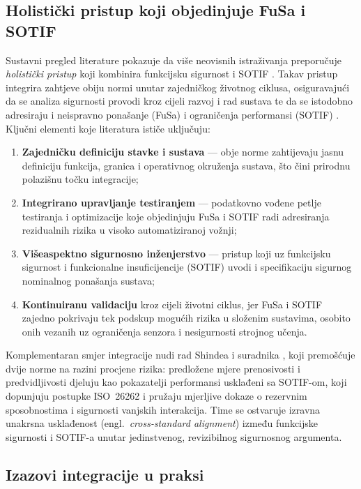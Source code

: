 \subsection{Holistički pristup koji objedinjuje FuSa i SOTIF}

Sustavni pregled literature pokazuje da više neovisnih istraživanja preporučuje \textit{holistički pristup} koji kombinira funkcijsku sigurnost i SOTIF \cite{patel2025sotifslr}. Takav pristup integrira zahtjeve obiju normi unutar zajedničkog životnog ciklusa, osiguravajući da se analiza sigurnosti provodi kroz cijeli razvoj i rad sustava te da se istodobno adresiraju i neispravno ponašanje (FuSa) i ograničenja performansi (SOTIF) \cite{patel2025sotifslr}. Ključni elementi koje literatura ističe uključuju:

\begin{enumerate}
  \item \textbf{Zajedničku definiciju stavke i sustava} — obje norme zahtijevaju jasnu definiciju funkcija, granica i operativnog okruženja sustava, što čini prirodnu polazišnu točku integracije;
  \item \textbf{Integrirano upravljanje testiranjem} — podatkovno vođene petlje testiranja i optimizacije koje objedinjuju FuSa i SOTIF radi adresiranja rezidualnih rizika u visoko automatiziranoj vožnji;
  \item \textbf{Višeaspektno sigurnosno inženjerstvo} — pristup koji uz funkcijsku sigurnost i funkcionalne insuficijencije (SOTIF) uvodi i specifikaciju sigurnog nominalnog ponašanja sustava;
  \item \textbf{Kontinuiranu validaciju} kroz cijeli životni ciklus, jer FuSa i SOTIF zajedno pokrivaju tek podskup mogućih rizika u složenim sustavima, osobito onih vezanih uz ograničenja senzora i nesigurnosti strojnog učenja.
\end{enumerate}

Komplementaran smjer integracije nudi rad Shindea i suradnika \cite{shinde2026reimagining}, koji premošćuje dvije norme na razini procjene rizika: predložene mjere prenosivosti i predvidljivosti djeluju kao pokazatelji performansi usklađeni sa SOTIF-om, koji dopunjuju postupke ISO~26262 i pružaju mjerljive dokaze o rezervnim sposobnostima i sigurnosti vanjskih interakcija. Time se ostvaruje izravna unakrsna usklađenost (engl.\ \textit{cross-standard alignment}) između funkcijske sigurnosti i SOTIF-a unutar jedinstvenog, revizibilnog sigurnosnog argumenta.

\subsection{Izazovi integracije u praksi}

